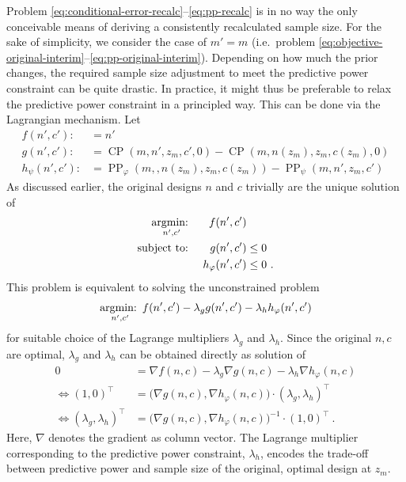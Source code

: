 \documentclass{article}
\newcommand{\st}{\operatorname{subject\ to:\ }}
\newcommand{\argmin}[1]{\operatornamewithlimits{argmin:\ }_{#1}}
\newcommand{\CP}{\ensuremath{\operatorname{CP}}}
\newcommand{\PP}{\ensuremath{\operatorname{PP}}}
\begin{document}
Problem \eqref{eq:conditional-error-recalc}--\eqref{eq:pp-recalc} is in no way the only conceivable
means of deriving a consistently recalculated sample size.
For the sake of simplicity, we consider the case of $m'=m$ (i.e.~problem \eqref{eq:objective-original-interim}--\eqref{eq:pp-original-interim}).
Depending on how much the prior changes, 
the required sample size adjustment to meet the predictive power constraint can be quite drastic.
In practice, it might thus be preferable to relax the predictive power constraint in a principled way.
This can be done via the Lagrangian mechanism. 
Let
\begin{align}
    f(n', c') :&= n' \\
    g(n', c') :&= \CP(m, n', z_{m}, c', 0) - \CP(m, n(z_m), z_{m}, c(z_m), 0) \\
    h_\psi(n', c') :&= \PP_\varphi(m, , n(z_m), z_{m}, c(z_m)) - \PP_\psi(m, n', z_{m}, c')
\end{align}
As discussed earlier, the original designs $n$ and $c$ trivially are the unique solution of
\begin{align}
    \argmin{n',c'} && f(n',c') & \\
    \st 
    && g(n',c') &\leq 0 \\
    && h_\varphi(n',c') &\leq 0 \ .
\end{align}
This problem is equivalent to solving the unconstrained problem
\begin{align}
    \argmin{n',c'} f(n',c') - \lambda_g g(n',c') - \lambda_h h_\varphi(n',c') 
\end{align}
for suitable choice of the Lagrange multipliers $\lambda_g$ and $\lambda_h$.
Since the original $n, c$ are optimal, 
$\lambda_g$ and $\lambda_h$ can be obtained directly as solution of
\begin{align}
    0 &= \nabla f(n, c) - \lambda_g \nabla g(n, c) - \lambda_h \nabla h_\varphi(n, c) \\
   \Leftrightarrow (1, 0)^\top &= \big(\nabla g(n, c), \nabla h_\varphi(n, c)\big) \cdot (\lambda_g, \lambda_h)^\top \\
   \Leftrightarrow (\lambda_g, \lambda_h)^\top &= \big(\nabla g(n, c), \nabla h_\varphi(n, c)\big)^{-1} \cdot (1, 0)^\top\ . 
\end{align}
Here, $\nabla$ denotes the gradient as column vector.
The Lagrange multiplier corresponding to the predictive power constraint, $\lambda_h$, encodes the trade-off between predictive power and sample size of the original, 
optimal design at $z_m$. 
\end{document}
